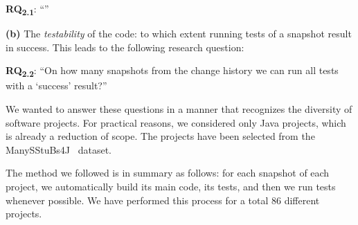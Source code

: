 \textbf{RQ\textsubscript{2.1}}: ``\RQI''

\textbf{(b)} The \textit{testability} of the code: to which extent running tests of a snapshot result in success. 
This leads to the following research question:


\def \RQII{On how many snapshots from the change history we can run all tests with a `success' result?}

\textbf{RQ\textsubscript{2.2}}: ``\RQII''


We wanted to answer these questions in a manner that recognizes the diversity of software projects. 
For practical reasons, we considered only Java projects, which is already a reduction of scope. 
The projects have been selected from the ManySStuBs4J~\cite{karampatsis2020often} dataset.

The method we followed is in summary as follows: for each snapshot of each project, we automatically build its main code, its tests, and then we run tests whenever possible. 
We have performed this process for a total 86 different projects.


